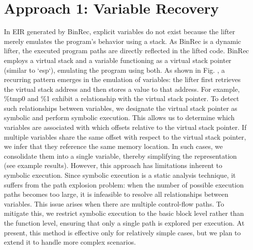 \section{Approach 1: Variable Recovery}
In EIR generated by BinRec, explicit variables do not exist because the lifter
merely emulates the program’s behavior using a stack. As BinRec is a dynamic
lifter, the executed program paths are directly reflected in the lifted code.
BinRec employs a virtual stack and a variable functioning as a virtual stack
pointer (similar to `esp`), emulating the program using both.
As shown in Fig. , a recurring pattern emerges in the emulation of variables:
the lifter first retrieves the virtual stack address and then stores a value to
that address. For example, \%tmp0 and \%1 exhibit a relationship with the
virtual stack pointer. To detect such relationships between variables, we
designate the virtual stack pointer as symbolic and perform symbolic execution.
This allows us to determine which variables are associated with which offsets
relative to the virtual stack pointer. If multiple variables share the same
offset with respect to the virtual stack pointer, we infer that they reference
the same memory location. In such cases, we consolidate them into a single
variable, thereby simplifying the representation (see example results).
However, this approach has limitations inherent to symbolic execution. Since
symbolic execution is a static analysis technique, it suffers from the path
explosion problem: when the number of possible execution paths becomes too
large, it is infeasible to resolve all relationships between variables. This
issue arises when there are multiple control-flow paths. To mitigate this, we
restrict symbolic execution to the basic block level rather than the
function level, ensuring that only a single path is explored per execution. At
present, this method is effective only for relatively simple cases, but we plan
to extend it to handle more complex scenarios.

